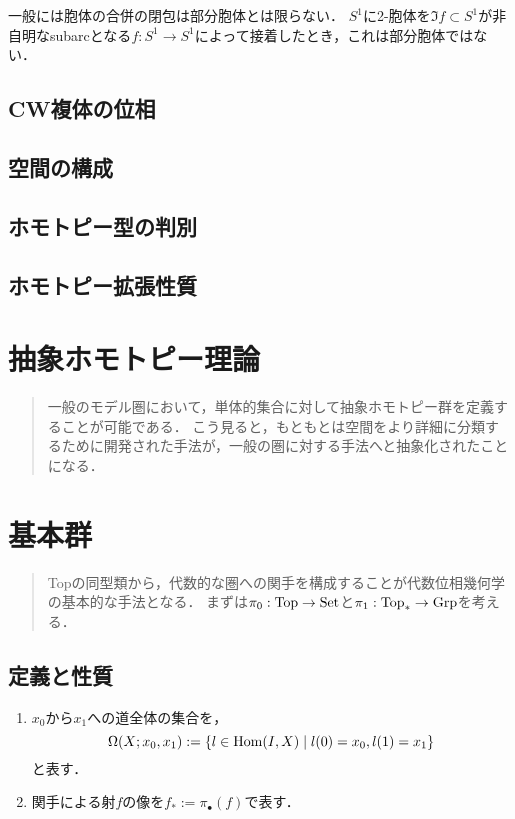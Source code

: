 \documentclass[uplatex,dvipdfmx]{jsreport}
\begin{document}
\begin{remark}
    一般には胞体の合併の閉包は部分胞体とは限らない．
    $S^1$に2-胞体を$\Im f\subset S^1$が非自明なsubarcとなる$f:S^1\to S^1$によって接着したとき，これは部分胞体ではない．
\end{remark}

\section{CW複体の位相}

\section{空間の構成}

\section{ホモトピー型の判別}

\section{ホモトピー拡張性質}

\chapter{抽象ホモトピー理論}

\begin{quotation}
    一般のモデル圏において，単体的集合に対して抽象ホモトピー群を定義することが可能である．
    こう見ると，もともとは空間をより詳細に分類するために開発された手法が，一般の圏に対する手法へと抽象化されたことになる．
\end{quotation}

\chapter{基本群}

\begin{quotation}
    Topの同型類から，代数的な圏への関手を構成することが代数位相幾何学の基本的な手法となる．
    まずは$\pi_0:\mathrm{Top}\to\mathrm{Set}$と$\pi_1:\mathrm{Top}_*\to\mathrm{Grp}$を考える．
\end{quotation}

\section{定義と性質}

\begin{notation}\mbox{}
    \begin{enumerate}
        \item $x_0$から$x_1$への道全体の集合を，
        \[\Omega(X;x_0,x_1):=\left\{l\in\mathrm{Hom}(I,X)\mid l(0)=x_0,l(1)=x_1\right\}\]
        と表す．
        \item 関手による射$f$の像を$f_*:=\pi_\bullet(f)$で表す．
    \end{enumerate}
\end{notation}
\end{document}
